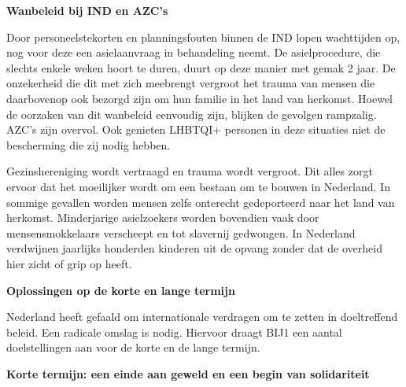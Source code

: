 \textbf{Wanbeleid bij IND en AZC's}

Door personeelstekorten en planningsfouten binnen de IND lopen
wachttijden op, nog voor deze een asielaanvraag in behandeling neemt. De
asielprocedure, die slechts enkele weken hoort te duren, duurt op deze
manier met gemak 2 jaar. De onzekerheid die dit met zich meebrengt
vergroot het trauma van mensen die daarbovenop ook bezorgd zijn om hun
familie in het land van herkomst. Hoewel de oorzaken van dit wanbeleid
eenvoudig zijn, blijken de gevolgen rampzalig. AZC's zijn overvol. Ook
genieten LHBTQI+ personen in deze situaties niet de bescherming die zij
nodig hebben.

Gezinshereniging wordt vertraagd en trauma wordt vergroot. Dit alles
zorgt ervoor dat het moeilijker wordt om een bestaan om te bouwen in
Nederland. In sommige gevallen worden mensen zelfs onterecht
gedeporteerd naar het land van herkomst. Minderjarige asielzoekers
worden bovendien vaak door mensensmokkelaars verscheept en tot slavernij
gedwongen. In Nederland verdwijnen jaarlijks honderden kinderen uit de
opvang zonder dat de overheid hier zicht of grip op heeft.

\textbf{Oplossingen op de korte en lange termijn}

Nederland heeft gefaald om internationale verdragen om te zetten in
doeltreffend beleid. Een radicale omslag is nodig. Hiervoor draagt BIJ1
een aantal doelstellingen aan voor de korte en de lange termijn.

\textbf{Korte termijn: een einde aan geweld en een begin van
solidariteit}

